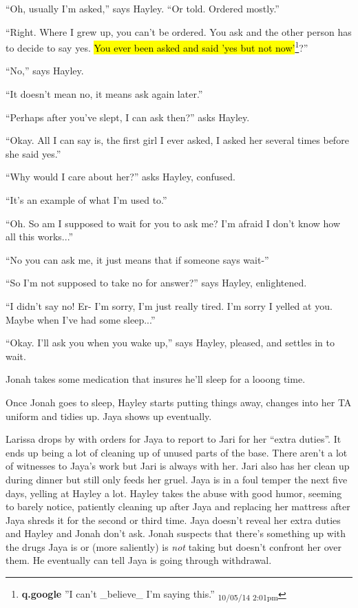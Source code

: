 ``Oh, usually I'm asked,'' says Hayley.  ``Or told.  Ordered mostly.''

``Right.  Where I grew up, you can't be ordered.  You ask and the other person has to decide to say yes.  \hl{You ever been asked and said 'yes but not now'}\footnote{\textbf{q.google }''I can't \_believe\_ I'm saying this.'' \textsubscript{10/05/14 2:01pm}}?''

``No,'' says Hayley.

``It doesn't mean no, it means ask again later.''

``Perhaps after you've slept, I can ask then?'' asks Hayley.

``Okay.  All I can say is, the first girl I ever asked, I asked her several times before she said yes.''

``Why would I care about her?'' asks Hayley, confused.

``It's an example of what I'm used to.''

``Oh.  So am I supposed to wait for you to ask me?  I'm afraid I don't know how all this works...''

``No you can ask me, it just means that if someone says wait-''

``So I'm not supposed to take no for answer?'' says Hayley, enlightened.

``I didn't say no!  Er- I'm sorry, I'm just really tired.  I'm sorry I yelled at you.  Maybe when I've had some sleep...''

``Okay.  I'll ask you when you wake up,'' says Hayley, pleased, and settles in to wait.

Jonah takes some medication that insures he'll sleep for a looong time.



Once Jonah goes to sleep, Hayley starts putting things away, changes into her TA uniform and tidies up.  Jaya shows up eventually.





Larissa drops by with orders for Jaya to report to Jari for her ``extra duties''.  It ends up being a lot of cleaning up of unused parts of the base.  There aren't a lot of witnesses to Jaya's work but Jari is always with her.  Jari also has her clean up during dinner but still only feeds her gruel.  Jaya is in a foul temper the next five days, yelling at Hayley a lot.  Hayley takes the abuse with good humor, seeming to barely notice, patiently cleaning up after Jaya and replacing her mattress after Jaya shreds it for the second or third time.  Jaya doesn't reveal her extra duties and Hayley and Jonah don't ask.  Jonah suspects that there's something up with the drugs Jaya is or (more saliently) is \textit{not} taking but doesn't confront her over them. He eventually can tell Jaya is going through withdrawal.



